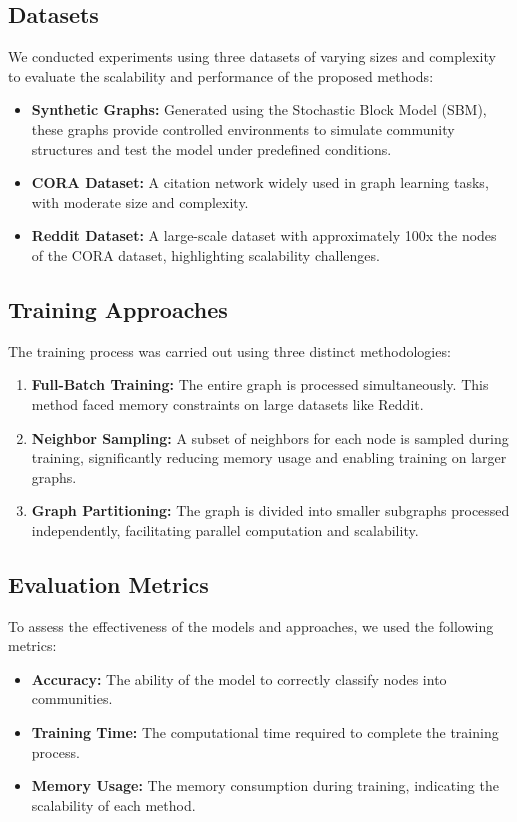 \documentclass{article}
\begin{document}
\subsection{Datasets}
We conducted experiments using three datasets of varying sizes and complexity to evaluate the scalability and performance of the proposed methods:
\begin{itemize}
    \item \textbf{Synthetic Graphs:} Generated using the Stochastic Block Model (SBM), these graphs provide controlled environments to simulate community structures and test the model under predefined conditions.
    \item \textbf{CORA Dataset:} A citation network widely used in graph learning tasks, with moderate size and complexity.
    \item \textbf{Reddit Dataset:} A large-scale dataset with approximately 100x the nodes of the CORA dataset, highlighting scalability challenges.
\end{itemize}

\subsection{Training Approaches}
The training process was carried out using three distinct methodologies:
\begin{enumerate}
    \item \textbf{Full-Batch Training:} The entire graph is processed simultaneously. This method faced memory constraints on large datasets like Reddit.
    \item \textbf{Neighbor Sampling:} A subset of neighbors for each node is sampled during training, significantly reducing memory usage and enabling training on larger graphs.
    \item \textbf{Graph Partitioning:} The graph is divided into smaller subgraphs processed independently, facilitating parallel computation and scalability.
\end{enumerate}

\subsection{Evaluation Metrics}
To assess the effectiveness of the models and approaches, we used the following metrics:
\begin{itemize}
    \item \textbf{Accuracy:} The ability of the model to correctly classify nodes into communities.
    \item \textbf{Training Time:} The computational time required to complete the training process.
    \item \textbf{Memory Usage:} The memory consumption during training, indicating the scalability of each method.
\end{itemize}
\end{document}
